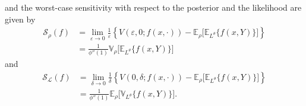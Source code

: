 \documentclass[11pt,reqno,letter]{amsart}
\theoremstyle{plain}
\theoremstyle{definition}
\numberwithin{equation}{section}
\numberwithin{theorem}{section}
\numberwithin{table}{section}
\numberwithin{figure}{section}
\begin{document}
and the worst-case sensitivity with respect to the posterior and the likelihood are given by
\begin{align}
{\mathcal S}_{\rho}(f) & = \lim_{\varepsilon\rightarrow 0}\frac{1}{\varepsilon} \left\{V(\varepsilon, 0; f(x, \cdot)) - {\mathbb E}_\rho \Big[{\mathbb E}_{L^\theta}\big\{f(x, Y)\big\}\Big]\right\}  \nonumber \\ 
& =  \frac{1}{\phi{''}(1)} {\mathbb V}_{\rho} \Big[{\mathbb E}_{L^\theta}\big\{f(x, Y)\big\}\Big]
\label{eq:WCSprior} 
\end{align}
and
\begin{align}
{\mathcal S}_{\mathcal L}(f) 
& = \lim_{\delta\rightarrow 0} \frac{1}{\delta} \left\{V(0, \delta; f(x, \cdot)) - {\mathbb E}_\rho \Big[{\mathbb E}_{L^\theta}\big\{f(x, Y)\big\}\Big]\right\}  \nonumber \\ 
& = \frac{1}{\phi{''}(1)} {\mathbb E}_{\rho} \Big[{\mathbb V}_{L^\theta}\big\{f(x, Y)\big\}\Big].
\label{eq:WCSlikelihood}
\end{align}
\end{document}
